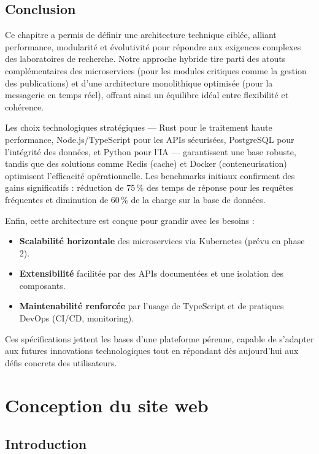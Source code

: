 \documentclass[12pt]{rapportPfe}
\begin{document}
\section{Conclusion}
Ce chapitre a permis de définir une architecture technique ciblée, alliant performance, modularité et évolutivité pour répondre aux exigences complexes des laboratoires de recherche. Notre approche hybride tire parti des atouts complémentaires des microservices (pour les modules critiques comme la gestion des publications) et d'une architecture monolithique optimisée (pour la messagerie en temps réel), offrant ainsi un équilibre idéal entre flexibilité et cohérence.

Les choix technologiques stratégiques — Rust pour le traitement haute performance, Node.js/TypeScript pour les APIs sécurisées, PostgreSQL pour l’intégrité des données, et Python pour l’IA — garantissent une base robuste, tandis que des solutions comme Redis (cache) et Docker (conteneurisation) optimisent l’efficacité opérationnelle. Les benchmarks initiaux confirment des gains significatifs : réduction de 75\,\% des temps de réponse pour les requêtes fréquentes et diminution de 60\,\% de la charge sur la base de données.

Enfin, cette architecture est conçue pour grandir avec les besoins :

\begin{itemize}
    \item \textbf{Scalabilité horizontale} des microservices via Kubernetes (prévu en phase 2).
    \item \textbf{Extensibilité} facilitée par des APIs documentées et une isolation des composants.
    \item \textbf{Maintenabilité renforcée} par l’usage de TypeScript et de pratiques DevOps (CI/CD, monitoring).
\end{itemize}

Ces spécifications jettent les bases d’une plateforme pérenne, capable de s’adapter aux futures innovations technologiques tout en répondant dès aujourd’hui aux défis concrets des utilisateurs.

\chapter{Conception du site web}

\section{Introduction}
\end{document}
